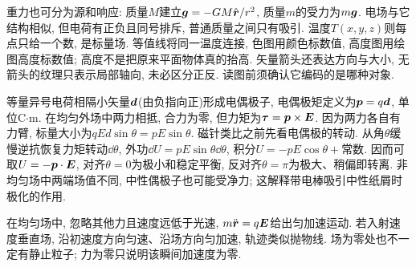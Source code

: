 重力也可分为源和响应: 质量$M$建立$\boldsymbol{g}=-GM\hat{\boldsymbol{r}}/r^2$, 质量$m$的受力为$m\boldsymbol{g}$. 电场与它结构相似, 但电荷有正负且同号排斥, 普通质量之间只有吸引. 温度$T(x,y,z)$则每点只给一个数, 是标量场. 等值线将同一温度连接, 色图用颜色标数值, 高度图用绘图高度标数值; 高度不是把原来平面物体真的抬高. 矢量箭头还表达方向与大小, 无箭头的纹理只表示局部轴向, 未必区分正反. 读图前须确认它编码的是哪种对象.

等量异号电荷相隔小矢量$\boldsymbol{d}$(由负指向正)形成电偶极子, 电偶极矩定义为$\boldsymbol{p}=q\boldsymbol{d}$, 单位C$\cdot$m. 在均匀外场中两力相抵, 合力为零, 但力矩为$\boldsymbol{\tau}=\boldsymbol{p}\times\boldsymbol{E}$. 因为两力各自有力臂, 标量大小为$qEd\sin\theta=pE\sin\theta$. 磁针类比之前先看电偶极的转动. 从角$\theta$缓慢逆抗恢复力矩转动$\dd\theta$, 外功$\dd U=pE\sin\theta\dd\theta$, 积分$U=-pE\cos\theta+\text{常数}$. 因而可取$U=-\boldsymbol{p}\cdot\boldsymbol{E}$, 对齐$\theta=0$为极小和稳定平衡, 反对齐$\theta=\pi$为极大、稍偏即转离. 非均匀场中两端场值不同, 中性偶极子也可能受净力; 这解释带电棒吸引中性纸屑时极化的作用.

在均匀场中, 忽略其他力且速度远低于光速, $m\ddot{\boldsymbol{r}}=q\boldsymbol{E}$给出匀加速运动. 若入射速度垂直场, 沿初速度方向匀速、沿场方向匀加速, 轨迹类似抛物线. 场为零处也不一定有静止粒子; 力为零只说明该瞬间加速度为零.
